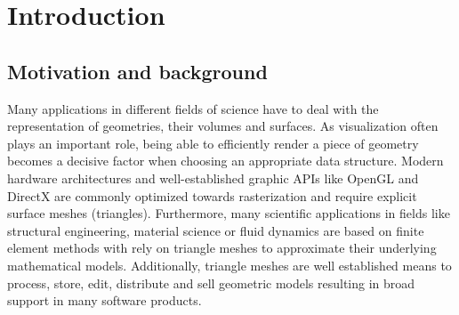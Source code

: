 \chapter{Introduction}
\label{ch:introduction}

\section{Motivation and background}
\label{ch:motivation}

Many applications in different fields of science have to deal with the representation of geometries, their volumes and surfaces.
As visualization often plays an important role, being able to efficiently render a piece of geometry becomes a decisive factor when choosing an appropriate data structure.
Modern hardware architectures and well-established graphic APIs like OpenGL and DirectX are commonly optimized towards rasterization and require explicit surface meshes (\ie triangles).
Furthermore, many scientific applications in fields like structural engineering, material science or fluid dynamics are based on finite element methods with rely on triangle meshes to approximate their underlying mathematical models.
Additionally, triangle meshes are well established means to process, store, edit, distribute and sell geometric models resulting in broad support in many software products.


